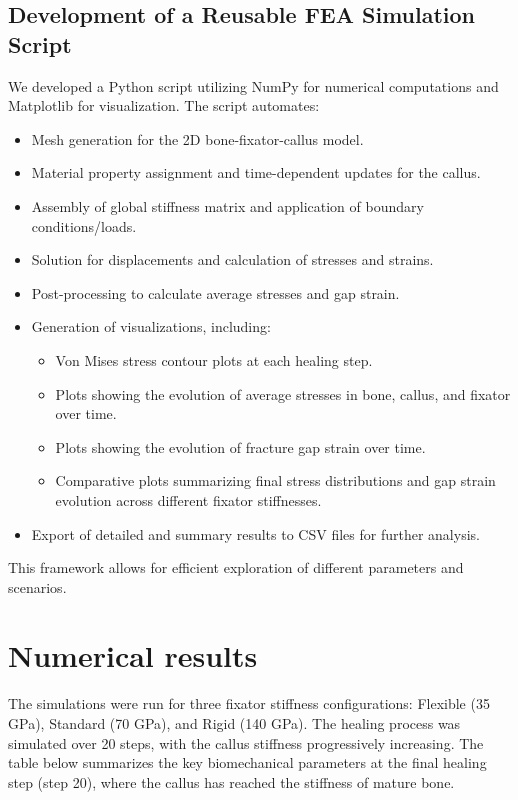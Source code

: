 \documentclass{article}
\begin{document}
\subsection{Development of a Reusable FEA Simulation Script}
We developed a Python script utilizing NumPy for numerical computations and Matplotlib for visualization. The script automates:
\begin{itemize}
  \item Mesh generation for the 2D bone-fixator-callus model.
  \item Material property assignment and time-dependent updates for the callus.
  \item Assembly of global stiffness matrix and application of boundary conditions/loads.
  \item Solution for displacements and calculation of stresses and strains.
  \item Post-processing to calculate average stresses and gap strain.
  \item Generation of visualizations, including:
        \begin{itemize}
          \item Von Mises stress contour plots at each healing step.
          \item Plots showing the evolution of average stresses in bone, callus, and fixator over time.
          \item Plots showing the evolution of fracture gap strain over time.
          \item Comparative plots summarizing final stress distributions and gap strain evolution across different fixator stiffnesses.
        \end{itemize}
  \item Export of detailed and summary results to CSV files for further analysis.
\end{itemize}
This framework allows for efficient exploration of different parameters and scenarios.

\section{Numerical results}

The simulations were run for three fixator stiffness configurations: Flexible (35 GPa), Standard (70 GPa), and Rigid (140 GPa). The healing process was simulated over 20 steps, with the callus stiffness progressively increasing. The table below summarizes the key biomechanical parameters at the final healing step (step 20), where the callus has reached the stiffness of mature bone.
\end{document}
